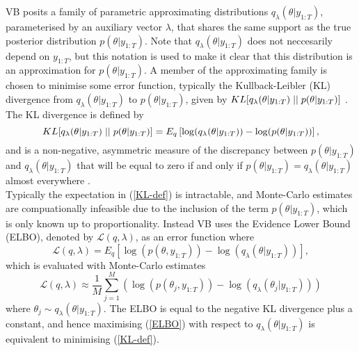 \documentclass[12pt,a4paper]{article}\usepackage[]{graphicx}\usepackage[]{color}
\begin{document}
VB posits a family of parametric approximating distributions $q_{\lambda}(\theta |y_{1:T})$, parameterised by an auxiliary vector $\lambda$, that shares the same support as the true posterior distribution $p(\theta |y_{1:T})$. Note that $q_{\lambda}(\theta |y_{1:T})$ does not neccesarily depend on $y_{1:T}$, but this notation is used to make it clear that this distribution is an approximation for $p(\theta |y_{1:T})$. A member of the approximating family is chosen to minimise some error function, typically the Kullback-Leibler (KL) divergence from $q_{\lambda}(\theta |y_{1:T})$ to $p(\theta |y_{1:T})$, given by $KL[q_{\lambda}(\theta |y_{1:T})\hspace{.1cm}||\hspace{.1cm}p(\theta |y_{1:T})]$ \citep{Kullback1951}. The KL divergence is defined by
\begin{equation}
\label{KL-def}
KL[q_{\lambda}(\theta |y_{1:T})\hspace{.1cm}||\hspace{.1cm}p(\theta |y_{1:T})] = E_q \left[ \log(q_{\lambda}(\theta |y_{1:T})) - \log(p(\theta |y_{1:T})) \right],
\end{equation}
and is a non-negative, asymmetric measure of the discrepancy between $p(\theta |y_{1:T})$ and $q_{\lambda}(\theta | y_{1:T})$  that will be equal to zero if and only if $p(\theta | y_{1:T}) = q_{\lambda}(\theta | y_{1:T})$ almost everywhere \citep{Bishop2006}.
\\

Typically the expectation in (\ref{KL-def}) is intractable, and Monte-Carlo estimates are compuationally infeasible due to the inclusion of the term $p(\theta | y_{1:T})$, which is only known up to proportionality. Instead VB uses the Evidence Lower Bound (ELBO), denoted by $\mathcal{L}(q, \lambda)$, as an error function where
\begin{equation}
\label{ELBO}
\mathcal{L}(q, \lambda) = E_q \left[\log(p(\theta, y_{1:T})) - \log(q_{\lambda}(\theta | y_{1:T}))\right],
\end{equation}
which is evaluated with Monte-Carlo estimates
\begin{equation}
\label{ELBO-MC}
\mathcal{L}(q, \lambda) \approx \frac{1}{M} \sum_{j=1}^M \left(\log(p(\theta_{j}, y_{1:T})) - \log(q_{\lambda}(\theta_{j} | y_{1:T})) \right)
\end{equation}
where $\theta_{j} \sim q_{\lambda}(\theta | y_{1:T})$. The ELBO is equal to the negative KL divergence plus a constant, and hence maximising (\ref{ELBO}) with respect to $q_{\lambda}(\theta | y_{1:T})$ is equivalent to minimising (\ref{KL-def}).
\end{document}
